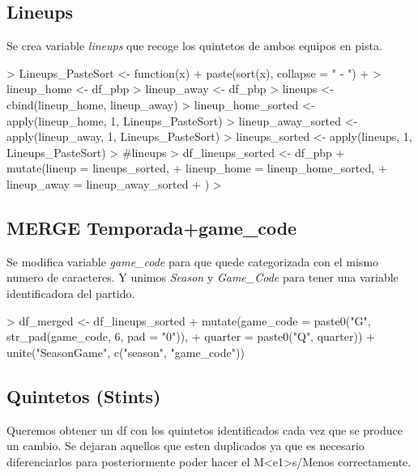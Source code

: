\documentclass[paper=a4, fontsize=9pt]{article}
\begin{document}
\subsection{Lineups}

Se crea variable \emph{lineups} que recoge los quintetos de ambos equipos en pista.

\begin{Schunk}
\begin{Sinput}
> Lineups_PasteSort <- function(x) {
+   paste(sort(x), collapse = " - ")
+ }
> lineup_home <- df_pbp %
> lineup_away <- df_pbp %
> lineups     <- cbind(lineup_home, lineup_away)
> lineup_home_sorted <- apply(lineup_home, 1, Lineups_PasteSort)
> lineup_away_sorted <- apply(lineup_away, 1, Lineups_PasteSort)
> lineups_sorted     <- apply(lineups, 1, Lineups_PasteSort)
> #lineups
> df_lineups_sorted <- df_pbp %
+   mutate(lineup = lineups_sorted,
+     lineup_home = lineup_home_sorted,
+     lineup_away = lineup_away_sorted
+   ) %
> 
\end{Sinput}
\end{Schunk}

\subsection{MERGE Temporada+game_code}

Se modifica variable \emph{game_code} para que quede categorizada con el mismo numero de caracteres. Y unimos \emph{Season} y \emph{Game_Code} para tener una variable identificadora del partido.

\begin{Schunk}
\begin{Sinput}
> df_merged <- df_lineups_sorted %
+   mutate(game_code = paste0("G", str_pad(game_code, 6, pad = "0")), 
+                      quarter   = paste0("Q", quarter)) %
+   unite("SeasonGame", c("season", "game_code"))
\end{Sinput}
\end{Schunk}

\subsection{Quintetos (Stints)}

Queremos obtener un df con los quintetos identificados cada vez que se produce un cambio. Se dejaran aquellos que esten duplicados ya que es necesario diferenciarlos para posteriormente poder hacer el M<e1>s/Menos correctamente. 
\end{document}
